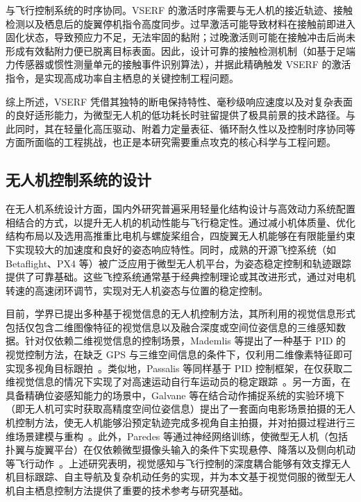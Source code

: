 与飞行控制系统的时序协同。VSERF 的激活时序需要与无人机的接近轨迹、接触检测以及栖息后的旋翼停机指令高度同步。过早激活可能导致材料在接触前即进入固化状态，导致预应力不足，无法牢固的黏附；过晚激活则可能在接触冲击后尚未形成有效黏附力便已脱离目标表面。因此，设计可靠的接触检测机制（如基于足端力传感器或惯性测量单元的接触事件识别算法），并据此精确触发 VSERF 的激活指令，是实现高成功率自主栖息的关键控制工程问题。
 
综上所述，VSERF 凭借其独特的断电保持特性、毫秒级响应速度以及对复杂表面的良好适形能力，为微型无人机的低功耗长时驻留提供了极具前景的技术路径。与此同时，其在轻量化高压驱动、附着力定量表征、循环耐久性以及控制时序协同等方面所面临的工程挑战，也正是本研究需要重点攻克的核心科学与工程问题。

\subsection{无人机控制系统的设计}

在无人机系统设计方面，国内外研究普遍采用轻量化结构设计与高效动力系统配置相结合的方式，以提升无人机的机动性能与飞行稳定性。通过减小机体质量、优化结构布局以及选用高推重比电机与螺旋桨组合，四旋翼无人机能够在有限能量约束下实现较大的加速度和良好的姿态响应特性。同时，成熟的开源飞控系统（如 Betaflight、PX4 等）被广泛应用于微型无人机平台，为姿态稳定控制和轨迹跟踪提供了可靠基础\cite{betaflight,PX4}。这些飞控系统通常基于经典控制理论或其改进形式，通过对电机转速的高速闭环调节，实现对无人机姿态与位置的稳定控制。

目前，学界已提出多种基于视觉信息的无人机控制方法，其所利用的视觉信息形式包括仅包含二维图像特征的视觉信息以及融合深度或空间位姿信息的三维感知数据。针对仅依赖二维视觉信息的控制场景，Mademlis 等提出了一种基于 PID 的视觉控制方法，在缺乏 GPS 与三维空间信息的条件下，仅利用二维像素特征即可实现多视角目标跟拍~\cite{mademlis2024vision}。类似地，Passalis 等同样基于 PID 控制框架，在仅获取二维视觉信息的情况下实现了对高速运动自行车运动员的稳定跟踪~\cite{passalis2018efficient}。另一方面，在具备精确位姿感知能力的场景中，Galvane 等在结合动作捕捉系统的实验环境下（即无人机可实时获取高精度空间位姿信息）提出了一套面向电影场景拍摄的无人机控制方法，使无人机能够沿预定轨迹完成多视角自主拍摄，并对拍摄过程进行三维场景建模与重构~\cite{galvane2017automated}。此外，Paredes 等通过神经网络训练，使微型无人机（包括扑翼与旋翼平台）在仅依赖微型摄像头输入的条件下实现悬停、降落以及侧向机动等飞行动作~\cite{paredes2024fully}。上述研究表明，视觉感知与飞行控制的深度耦合能够有效支撑无人机目标跟踪、自主导航及复杂机动任务的实现，并为本文基于视觉伺服的微型无人机自主栖息控制方法提供了重要的技术参考与研究基础。

